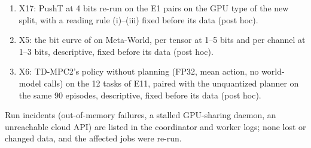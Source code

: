 \begin{enumerate}
\item[D5.] X17: PushT at 4 bits re-run on the E1 pairs on the GPU type of the new split, with a reading rule (i)--(iii) fixed before its data (post hoc).
\item[D6.] X5: the bit curve of \detnoise on Meta-World, per tensor at 1--5 bits and per channel at 1--3 bits, descriptive, fixed before its data (post hoc).
\item[D7.] X6: TD-MPC2's policy without planning (FP32, mean action, no world-model calls) on the 12 tasks of E11, paired with the unquantized planner on the same 90 episodes, descriptive, fixed before its data (post hoc).
\end{enumerate}
Run incidents (out-of-memory failures, a stalled GPU-sharing daemon, an unreachable cloud API) are listed in the coordinator and worker logs; none lost or changed data, and the affected jobs were re-run.
